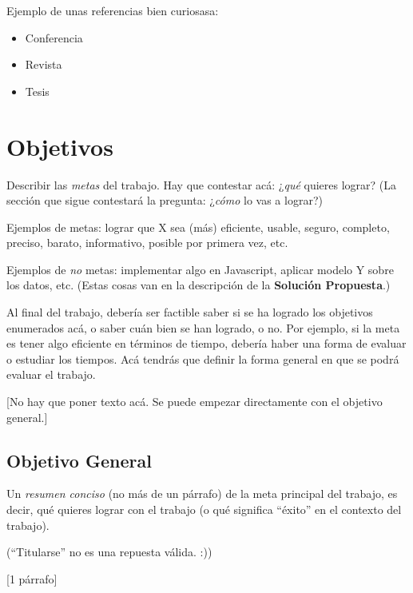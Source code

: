 \documentclass[guia]{upropuesta}
\begin{document}
Ejemplo de unas referencias bien curiosasa:

\begin{itemize}
  \item Conferencia~\cite{CorlessJK97}
  \item Revista~\cite{NewmanT42}
  \item Tesis~\cite{Turing38}
\end{itemize}


\section{Objetivos}\label{chap:obj}

\begin{pauta}
Describir las \textit{metas} del trabajo. Hay que contestar acá: ¿\textit{qué} quieres lograr? (La sección que sigue contestará la pregunta: ¿\textit{cómo} lo vas a lograr?)

Ejemplos de metas: lograr que X sea (más) eficiente, usable, seguro, completo, preciso, barato, informativo, posible por primera vez, etc.

Ejemplos de \textit{no} metas: implementar algo en Javascript, aplicar modelo Y sobre los datos, etc. (Estas cosas van en la descripción de la \textbf{Solución Propuesta}.)

Al final del trabajo, debería ser factible saber si se ha logrado los objetivos enumerados acá, o saber cuán bien se han logrado, o no. Por ejemplo, si la meta es tener algo eficiente en términos de tiempo, debería haber una forma de evaluar o estudiar los tiempos. Acá tendrás que definir la forma general en que se podrá evaluar el trabajo.

[No hay que poner texto acá. Se puede empezar directamente con el objetivo general.]
\end{pauta}

  \subsection*{Objetivo General}\label{sec:obj-g}
  
  \begin{pauta}
  Un \textit{resumen conciso} (no más de un párrafo) de la meta principal del trabajo, es decir, qué quieres lograr con el trabajo (o qué significa ``éxito'' en el contexto del trabajo).
  
  (``Titularse'' no es una repuesta válida. :))
  
  [1 párrafo]
  \end{pauta}
\end{document}
